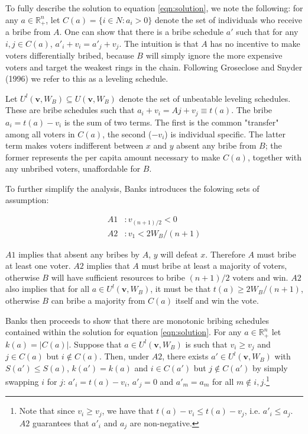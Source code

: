 \documentclass[12pt,a4paper]{article}
\newcommand{\real}{\mathbb{R}_+^n}
\begin{document}
To fully describe the solution to equation \ref{eqn:solution}, we note the following: for any $a \in \mathbb{R}_+^n$, let $C(a) = \{i \in N : a_i > 0\}$ denote the set of individuals who receive a bribe from $A$. One can show that there is a bribe schedule $a'$ such that for any $i,j \in C(a)$, $a'_i + v_i = a'_j + v_j$. The intuition is that $A$ has no incentive to make voters differentially bribed, because $B$ will simply ignore the more expensive voters and target the weakest rings in the chain. Following Groseclose and Snyder (1996) we refer to this as a leveling schedule.

Let $U^l(\mathbf{v}, W_B) \subseteq U(\mathbf{v}, W_B)$ denote the set of unbeatable leveling schedules. These are bribe schedules such that $a_i + v_i = Aj + v_j  \equiv t(a)$. The bribe $a_i = t(a) - v_i$ is the sum of two terms. The first is the common "transfer" among all voters in $C(a)$, the second ($-v_i$) is individual specific. The latter term makes voters indifferent between $x$ and $y$ absent any bribe from $B$; the former represents the per capita amount necessary to make $C(a)$, together with any unbribed voters, unaffordable for $B$.

To further simplify the analysis, Banks introduces the folowing sets of assumption:

\begin{align*}
    A1 &: v_{(n+1)/2} < 0\\
    A2 &: v_1 < 2W_B/(n+1) 
\end{align*}

$A1$ implies that absent any bribes by $A$, $y$ will defeat $x$. Therefore $A$ must bribe at least one voter. $A2$ implies that $A$ must bribe at least a majority of voters, otherwise $B$ will have sufficient resources to bribe $(n+1)/2$ voters and win. $A2$ also implies that for all $a \in U^l(\mathbf{v}, W_B)$, it must be that $t(a) \geq 2W_B/(n + 1)$, otherwise $B$ can bribe a majority from $C(a)$ itself and win the vote.

Banks then proceeds to show that there are monotonic bribing schedules contained within the solution for equation \ref{eqn:solution}. For any $a \in \real$ let $k(a) = \lvert C(a) \rvert$. Suppose that $a\in U^l(\mathbf{v}, W_B)$ is such that $v_i \geq v_j$ and $j \in C(a)$ but $i \notin C(a)$. Then, under $A2$, there exists $a' \in U^l(\mathbf{v}, W_B)$ with $S(a') \leq S(a)$, $k(a') = k(a)$ and $i \in C(a')$ but $j \notin C(a')$ by simply swapping $i$ for $j$: $a'_i = t(a) - v_i$, $a'_j = 0$ and $a'_m = a_m$ for all $m \notin i, j$.\footnote{Note that since $v_i \geq v_j$, we have that $t(a) - v_i \leq  t(a) - v_j$, i.e. $a'_i \leq a_j$. $A2$ guarantees that $a'_i$ and $a_j$ are non-negative.}
\end{document}
